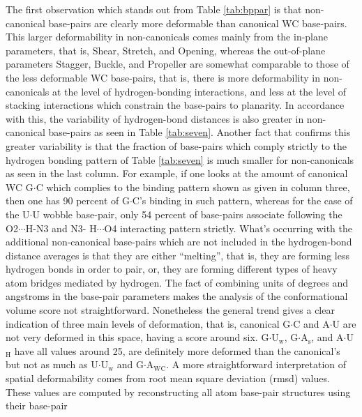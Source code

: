 The first  observation which stands out from  Table \ref{tab:bppar} is
that  non-canonical  base-pairs   are  clearly  more  deformable  than
canonical WC base-pairs.   This larger deformability in non-canonicals
comes mainly  from the in-plane  parameters, that is,  Shear, Stretch,
and Opening, whereas the  out-of-plane parameters Stagger, Buckle, and
Propeller are somewhat  comparable to those of the  less deformable WC
base-pairs, that is, there  is more deformability in non-canonicals at
the level of  hydrogen-bonding interactions, and less at  the level of
stacking interactions which constrain  the base-pairs to planarity. In
accordance with  this, the  variability of hydrogen-bond  distances is
also   greater  in   non-canonical   base-pairs  as   seen  in   Table
\ref{tab:seven}. Another  fact that confirms  this greater variability
is  that the  fraction  of  base-pairs which  comply  strictly to  the
hydrogen bonding pattern of  Table \ref{tab:seven} is much smaller for
non-canonicals as seen  in the last column. For  example, if one looks
at the amount of canonical  WC G$\cdot$C which complies to the binding
pattern shown  as given in  column three, then  one has 90  percent of
G$\cdot$C's  binding in  such pattern,  whereas  for the  case of  the
U$\cdot$U wobble  base-pair, only  54 percent of  base-pairs associate
following the  O2$\cdots$H-N3 and N3-  H$\cdots$O4 interacting pattern
strictly.    What's  occurring   with  the   additional  non-canonical
base-pairs  which  are  not  included in  the  hydrogen-bond  distance
averages  is that  they  are  either ``melting'',  that  is, they  are
forming less  hydrogen bonds  in order to  pair, or, they  are forming
different types of  heavy atom bridges mediated by  hydrogen. The fact
of  combining  units  of   degrees  and  angstroms  in  the  base-pair
parameters makes  the analysis of the conformational  volume score not
straightforward.   Nonetheless   the  general  trend   gives  a  clear
indication  of three main  levels of  deformation, that  is, canonical
G$\cdot$C and A$\cdot$U are not  very deformed in this space, having a
score around  six. G$\cdot$U$_{\text{w}}$, G$\cdot$A$_{\text{s}}$, and
A$\cdot$U$_{\text{H}}$ have all values  around 25, are definitely more
deformed    than    the   canonical's    but    not    as   much    as
U$\cdot$U$_{\text{w}}$    and    G$\cdot$A$_{\text{WC}}$.    A    more
straightforward  interpretation of  spatial  deformability comes  from
root mean square deviation (rmsd) values. These values are computed by
reconstructing  all atom  base-pair structures  using  their base-pair
